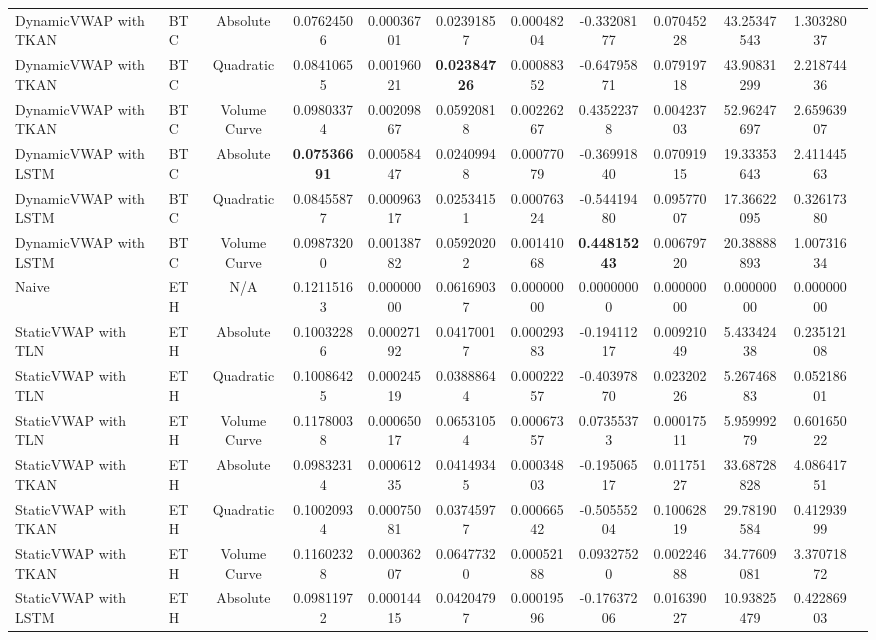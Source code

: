 \begin{table}[H]
{\begin{tabular}{llcccccccccc}
        DynamicVWAP with TKAN & BTC & Absolute & 0.07624506 & 0.00036701 & 0.02391857 & 0.00048204 & -0.33208177 & 0.07045228 & 43.25347543 & 1.30328037 \\
        DynamicVWAP with TKAN & BTC & Quadratic & 0.08410655 & 0.00196021 & \textbf{0.02384726} & 0.00088352 & -0.64795871 & 0.07919718 & 43.90831299 & 2.21874436 \\
        DynamicVWAP with TKAN & BTC & Volume Curve & 0.09803374 & 0.00209867 & 0.05920818 & 0.00226267 & 0.43522378 & 0.00423703 & 52.96247697 & 2.65963907 \\
        DynamicVWAP with LSTM & BTC & Absolute & \textbf{0.07536691} & 0.00058447 & 0.02409948 & 0.00077079 & -0.36991840 & 0.07091915 & 19.33353643 & 2.41144563 \\
        DynamicVWAP with LSTM & BTC & Quadratic & 0.08455877 & 0.00096317 & 0.02534151 & 0.00076324 & -0.54419480 & 0.09577007 & 17.36622095 & 0.32617380 \\
        DynamicVWAP with LSTM & BTC & Volume Curve & 0.09873200 & 0.00138782 & 0.05920202 & 0.00141068 & \textbf{0.44815243} & 0.00679720 & 20.38888893 & 1.00731634 \\
        \hline
        Naive & ETH & N/A & 0.12115163 & 0.00000000 & 0.06169037 & 0.00000000 & 0.00000000 & 0.00000000 & 0.00000000 & 0.00000000 \\
        StaticVWAP with TLN & ETH & Absolute & 0.10032286 & 0.00027192 & 0.04170017 & 0.00029383 & -0.19411217 & 0.00921049 & 5.43342438 & 0.23512108 \\
        StaticVWAP with TLN & ETH & Quadratic & 0.10086425 & 0.00024519 & 0.03888644 & 0.00022257 & -0.40397870 & 0.02320226 & 5.26746883 & 0.05218601 \\
        StaticVWAP with TLN & ETH & Volume Curve & 0.11780038 & 0.00065017 & 0.06531054 & 0.00067357 & 0.07355373 & 0.00017511 & 5.95999279 & 0.60165022 \\
        StaticVWAP with TKAN & ETH & Absolute & 0.09832314 & 0.00061235 & 0.04149345 & 0.00034803 & -0.19506517 & 0.01175127 & 33.68728828 & 4.08641751 \\
        StaticVWAP with TKAN & ETH & Quadratic & 0.10020934 & 0.00075081 & 0.03745977 & 0.00066542 & -0.50555204 & 0.10062819 & 29.78190584 & 0.41293999 \\
        StaticVWAP with TKAN & ETH & Volume Curve & 0.11602328 & 0.00036207 & 0.06477320 & 0.00052188 & 0.09327520 & 0.00224688 & 34.77609081 & 3.37071872 \\
        StaticVWAP with LSTM & ETH & Absolute & 0.09811972 & 0.00014415 & 0.04204797 & 0.00019596 & -0.17637206 & 0.01639027 & 10.93825479 & 0.42286903 \\

\end{tabular}}
\end{table}
